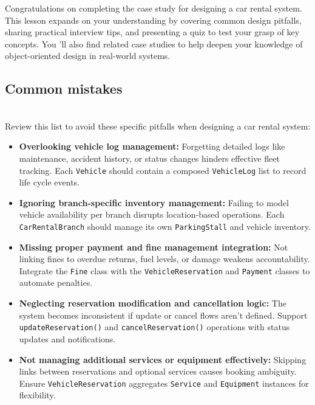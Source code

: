 

Congratulations on completing the case study for designing a car rental system. This lesson expands on your understanding by covering common design pitfalls, sharing practical interview tips, and presenting a quiz to test your grasp of key concepts. You 'll also find related case studies to help deepen your knowledge of object-oriented design in real-world systems.

\subsection{Common mistakes}\label{4q8kpmjcOmU7R2q4NENya}
\\
Review this list to avoid these specific pitfalls when designing a car rental system:

\begin{itemize}
\item
\protect{}\label{P1qGk6cn8VvYsM9fS82G8}
\textbf{Overlooking vehicle log management:} Forgetting detailed logs like maintenance, accident history, or status changes hinders effective fleet tracking. Each \texttt{Vehicle} should contain a composed \texttt{VehicleLog} list to record life cycle events.
\item
\protect{}\label{b1NE9iqFs1AmHiTjev2j4}
\textbf{Ignoring branch-specific inventory management:} Failing to model vehicle availability per branch disrupts location-based operations. Each \texttt{CarRentalBranch} should manage its own \texttt{ParkingStall} and vehicle inventory.
\item
\protect{}\label{p4XogWaDWtXhcw_4q4-5h}
\textbf{Missing proper payment and fine management integration:} Not linking fines to overdue returns, fuel levels, or damage weakens accountability. Integrate the \texttt{Fine} class with the \texttt{VehicleReservation} and \texttt{Payment} classes to automate penalties.
\item
\protect{}\label{J8ciEUoeaPmjJi-jne8Qe}
\textbf{Neglecting reservation modification and cancellation logic:} The system becomes inconsistent if update or cancel flows aren't defined. Support \texttt{updateReservation()} and \texttt{cancelReservation()} operations with status updates and notifications.
\item
\protect{}\label{ecMRhEpTya4Pd99Bmft6g}
\textbf{Not managing additional services or equipment effectively:} Skipping links between reservations and optional services causes booking ambiguity. Ensure \texttt{VehicleReservation} aggregates \texttt{Service} and \texttt{Equipment} instances for flexibility.
\end{itemize}

